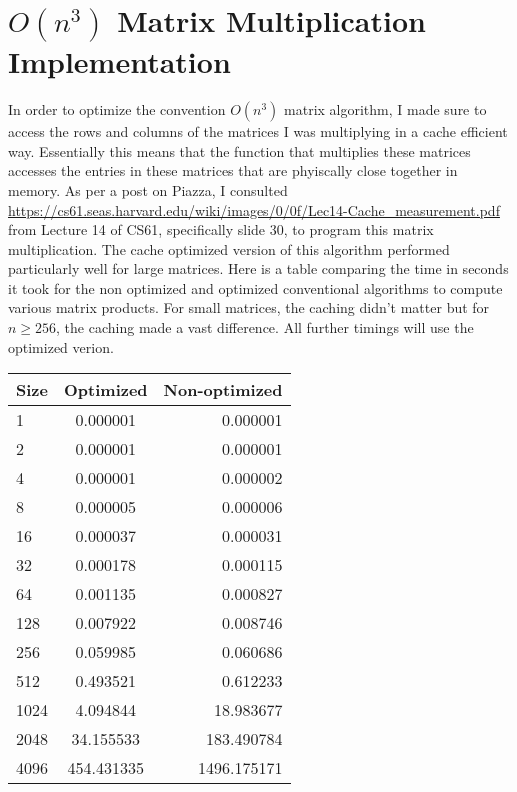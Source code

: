 \documentclass{article}
\begin{document}
	\section{$O(n^3)$ Matrix Multiplication Implementation}
	In order to optimize the convention $O(n^3)$ matrix algorithm, I made sure to access the rows and columns of the matrices I was multiplying in a cache efficient way. Essentially this means that the function that multiplies these matrices accesses the entries in these matrices that are phyiscally close together in memory.  As per a post on Piazza, I consulted \url{https://cs61.seas.harvard.edu/wiki/images/0/0f/Lec14-Cache_measurement.pdf} from Lecture 14 of CS61, specifically slide 30, to program this matrix multiplication. The cache optimized version of this algorithm performed particularly well for large matrices.  Here is a table comparing the time in seconds it took for the non optimized and optimized conventional algorithms to compute various matrix products. For small matrices, the caching didn't matter but for $n \geq 256$, the caching made a vast difference.  All further timings will use the optimized verion.  \\
	\noindent
	\begin{tabular}{l | c | r}
		Size & Optimized & Non-optimized\\
		\hline 
		1 & 0.000001 & 0.000001 \\ 
		2 & 0.000001 & 0.000001 \\ 
		4 & 0.000001 & 0.000002 \\ 
		8 & 0.000005 & 0.000006 \\ 
		16 & 0.000037 & 0.000031 \\ 
		32 & 0.000178 & 0.000115 \\ 
		64 & 0.001135 & 0.000827 \\ 
		128 & 0.007922 & 0.008746 \\ 
		256 & 0.059985 & 0.060686 \\ 
		512 & 0.493521 & 0.612233 \\ 
		1024 & 4.094844 & 18.983677 \\ 
		2048 & 34.155533 & 183.490784 \\ 
		4096 & 454.431335 & 1496.175171
	\end{tabular}
	
\end{document}
